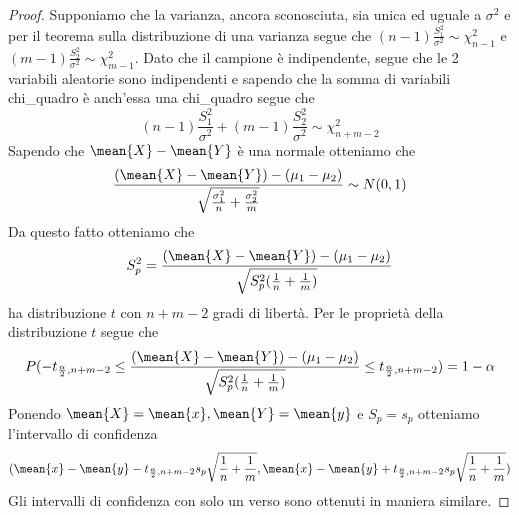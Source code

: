 \documentclass[a4paper,12pt, oneside]{book}
\begin{document}
\begin{proof}
    Supponiamo che la varianza, ancora sconosciuta, sia unica ed uguale a $\sigma^2$ e per il teorema sulla
    distribuzione di una varianza segue che $(n - 1)\frac{S_1^2}{\sigma^2} \sim \chi_{n - 1}^2$ e 
    $(m - 1) \frac{S_2^2}{\sigma^2} \sim \chi_{m - 1}^2$.\newline
    Dato che il campione è indipendente, segue che le 2 variabili aleatorie sono indipendenti e sapendo che la somma di
    variabili chi\_quadro è anch'essa una chi\_quadro segue che 
    \[ (n - 1)\frac{S_1^2}{\sigma^2} + (m - 1)\frac{S_2^2}{\sigma^2} \sim \chi_{n + m - 2}^2 \]
    Sapendo che $\mean{X} - \mean{Y}$ è una normale otteniamo che
    \[ \frac{(\mean{X} - \mean{Y}) - (\mu_1 - \mu_2)}{\sqrt{\frac{\sigma_1^2}{n} + \frac{\sigma_2^2}{m}}} \sim N(0, 1) \]
    Da questo fatto otteniamo che 
    \[ S_p^2 = \frac{(\mean{X} - \mean{Y}) - (\mu_1 - \mu_2)}{\sqrt{S_p^2(\frac{1}{n} + \frac{1}{m})}}\]
    ha distribuzione $t$ con $n + m - 2$ gradi di libertà.\newline
    Per le proprietà della distribuzione $t$ segue che
    \[ P(-t_{\frac{\alpha}{2}, n + m - 2} \leq 
             \frac{(\mean{X} - \mean{Y}) - (\mu_1 - \mu_2)}{\sqrt{S_p^2(\frac{1}{n} + \frac{1}{m})}}
                                          \leq t_{\frac{\alpha}{2}, n + m - 2}) = 1 - \alpha \]
    Ponendo $\mean{X} = \mean{x}, \mean{Y} = \mean{y}$ e $S_p = s_p$ otteniamo l'intervallo di confidenza
    \[ (\mean{x} - \mean{y} - t_{\frac{\alpha}{2}, n + m - 2} s_p \sqrt{\frac{1}{n} + \frac{1}{m}},
        \mean{x} - \mean{y} + t_{\frac{\alpha}{2}, n + m - 2} s_p \sqrt{\frac{1}{n} + \frac{1}{m}}) \]
    Gli intervalli di confidenza con solo un verso sono ottenuti in maniera similare.
\end{proof}
\end{document}
